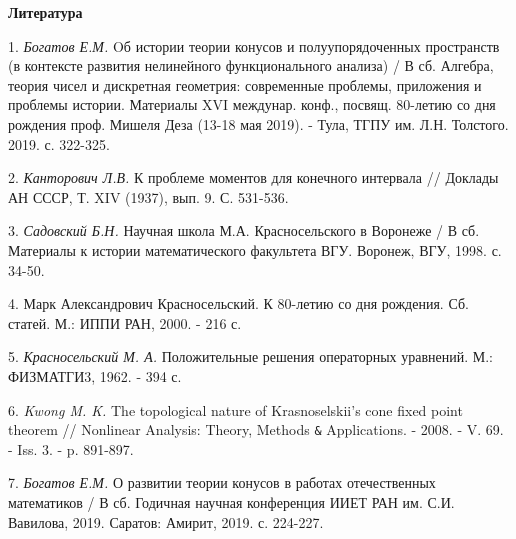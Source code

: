 \smallskip \centerline {\bf Литература} \nopagebreak

1. \textit{Богатов Е.М.}  Oб истории теории конусов и полуупорядоченных пространств (в контексте развития нелинейного функционального анализа) / В сб. Алгебра, теория чисел и дискретная геометрия: современные проблемы, приложения и проблемы истории. Материалы XVI  междунар. конф., посвящ. 80-летию со дня рождения проф.  Мишеля Деза (13-18 мая 2019). - Тула, ТГПУ им. Л.Н. Толстого.  2019. с. 322-325.

2. \textit{Канторович Л.В.} К проблеме моментов для конечного интервала // Доклады АН СССР, Т. XIV (1937), вып. 9. С. 531-536.

3. \textit{Садовский Б.Н.} Научная школа М.А. Красносельского в Воронеже / В сб. Материалы к истории математического факультета ВГУ. Воронеж, ВГУ, 1998. с. 34-50.

4. Марк Александрович Красносельский. К 80-летию со дня рождения. Сб. статей. М.: ИППИ РАН,  2000. - 216 с.

5. \textit{Красносельский М. А.} Положительные решения операторных уравнений. М.: ФИЗМАТГИ3, 1962. - 394 с.

6.	\textit{Kwong M. K.} The topological nature of Krasnoselskii's cone fixed point theorem // Nonlinear Analysis: Theory, Methods \verb'&' Applications. - 2008. - V. 69. - Iss. 3. - p. 891-897.

7. \textit{Богатов Е.М.} О развитии теории конусов в работах отечественных математиков / В сб. Годичная научная конференция ИИЕТ РАН им. С.И. Вавилова, 2019. Саратов: Амирит, 2019. с. 224-227.

